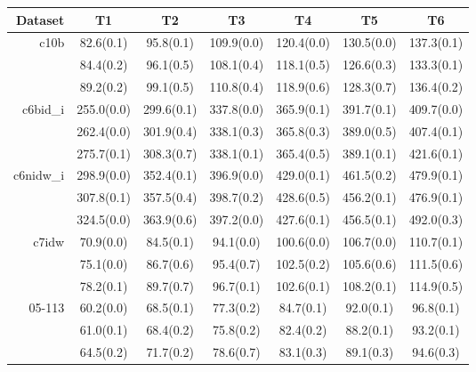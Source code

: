   \begin{table}[h]
   \scriptsize
    \centering
    \begin{tabular}[h]{rcccccc} \hline
      Dataset  &  T1 &  T2 & T3  & T4  &  T5 &   T6\\ \hline
      \multirow{3}{*}{c10b} &         82.6(0.1)  &   95.8(0.1)  &   109.9(0.0) &   120.4(0.0)  &  130.5(0.0)  &  137.3(0.1)  \\
         & 84.4(0.2)   &  96.1(0.5)  &   108.1(0.4)   &   118.1(0.5)  &    126.6(0.3)   &   133.3(0.1)    \\
     &89.2(0.2)   &   99.1(0.5)   &    110.8(0.4)     &   118.9(0.6) &    128.3(0.7)  &  136.4(0.2)  \\ \hline
      \multirow{3}{*}{c6bid\_i}   &     255.0(0.0)  &  299.6(0.1)  &  337.8(0.0)  &  365.9(0.1)  &  391.7(0.1)  &  409.7(0.0)  \\
         & 262.4(0.0) &   301.9(0.4)  &  338.1(0.3)    &  365.8(0.3)   &   389.0(0.5)   &   407.4(0.1)    \\
    & 275.7(0.1)  &   308.3(0.7)   &    338.1(0.1)    &    365.4(0.5)   &  389.1(0.1)  &  421.6(0.1)  \\ \hline
      \multirow{3}{*}{c6nidw\_i}  &   298.9(0.0)  &  352.4(0.1)  &  396.9(0.0)  &  429.0(0.1)  &  461.5(0.2)  &  479.9(0.1)  \\
      &   307.8(0.1)  &  357.5(0.4)  &  398.7(0.2)  &    428.6(0.5)  &    456.2(0.1)   &   476.9(0.1)    \\
    & 324.5(0.0)  &   363.9(0.6)    &   397.2(0.0)   &     427.6(0.1)  &   456.5(0.1)  &  492.0(0.3)  \\ \hline
      \multirow{3}{*}{c7idw}    &   70.9(0.0)   &  84.5(0.1)   &  94.1(0.0)   &  100.6(0.0)  &  106.7(0.0)   & 110.7(0.1)  \\
     &    75.1(0.0)  &   86.7(0.6) &    95.4(0.7) &      102.5(0.2)   &   105.6(0.6)    &  111.5(0.6)    \\
     & 78.2(0.1)  &    89.7(0.7)   &     96.7(0.1)     &   102.6(0.1)   &  108.2(0.1)  &  114.9(0.5)  \\ \hline
      \multirow{3}{*}{05-113}   &     60.2(0.0)  &   68.5(0.1)   &  77.3(0.2)  &   84.7(0.1)  &   92.0(0.1)   &  96.8(0.1)   \\
      &   61.0(0.1)  &   68.4(0.2)  &   75.8(0.2)    &   82.4(0.2)   &    88.2(0.1)    &   93.2(0.1)     \\
    & 64.5(0.2)  &    71.7(0.2)   &     78.6(0.7)    &     83.1(0.3)   &   89.1(0.3)   &  94.6(0.3)  \\ \hline

\end{tabular}
\end{table}
